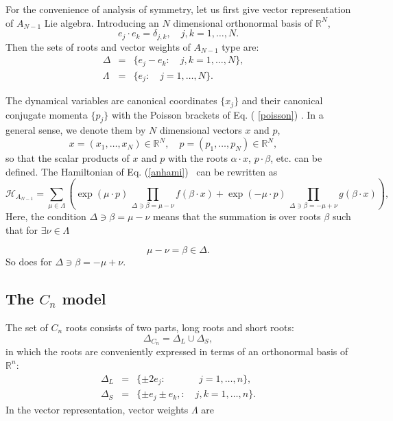 \documentclass[a4paper,12pt]{article}
\begin{document}
For the convenience of analysis of symmetry, let us first
give vector representation of $A_{N-1}$ Lie algebra.
Introducing an $N$ dimensional orthonormal basis of
${\mathbb R}^{N}$,
\begin{equation}
e_{j}\cdot e_{k}=\delta _{j,k},\quad j,k=1,\ldots ,N.
\end{equation}
Then the sets of roots and vector weights of $A_{N-1}$ type  are:
\begin{eqnarray}
\Delta &=&\{e_{j}-e_{k}:\quad j,k=1,\ldots ,N\},\quad  \label{anroot} \\
\Lambda &=&\{e_{j}:\quad j=1,\ldots ,N\}.  \label{anwei}
\end{eqnarray}

The dynamical variables are canonical coordinates
$\{x_{j}\}$ and their canonical conjugate momenta
$\{p_{j}\}$ with the Poisson brackets of Eq. (
\ref{poisson}) . In a general sense, we denote them by $N$
dimensional vectors $x$ and $p$,
\[
x=(x_{1},\ldots ,x_{N})\in {\mathbb R}^{N},\quad
p=(p_{1},\ldots ,p_{N})\in {
\mathbb R}^{N},\quad
\]
so that the scalar products of $x$ and $p$ with the roots
$\alpha \cdot x$, $ p\cdot \beta $, etc. can be defined.
The Hamiltonian of Eq. (\ref{anhami}) \ can be rewritten as
\begin{equation}
\mathcal{H}_{A_{N-1}}=\sum_{\mu \in \Lambda }\left( \exp \left(
\mu \cdot p\right) \,\prod_{\Delta \ni \beta =\mu -\nu }f(\beta \cdot
x){+}\exp \left(
-\mu \cdot p\right) \,\prod_{\Delta \ni \beta =-\mu +\nu }g(\beta
\cdot x)\right) ,
\end{equation}
Here, the condition $\Delta \ni \beta =\mu -\nu $ means that
the summation is over roots $\beta $ such that for $\exists
\nu \in \Lambda $

\begin{equation}
\mu -\nu =\beta \in \Delta .
\end{equation}
So does for $\Delta \ni \beta =-\mu +\nu .$

\subsection{The $C_{n}$ model}

The set of $C_{n}$ roots consists of two parts, long roots
and short roots:
\begin{equation}
\Delta _{C_{n}}=\Delta _{L}\cup \Delta _{S},  \label{cnroot}
\end{equation}
in which the roots are conveniently expressed in terms of an
orthonormal basis of ${\mathbb R}^{n}$:
\begin{eqnarray}
\Delta _{L} &=&\{\pm 2e_{j}:\quad \qquad \ \ j=1,\ldots ,n\},  \nonumber \\
\Delta _{S} &=&\{\pm e_{j}\pm e_{k},:\quad j,k=1,\ldots ,n\}.
\end{eqnarray}
In the vector representation, vector weights $\Lambda $ are
\end{document}
